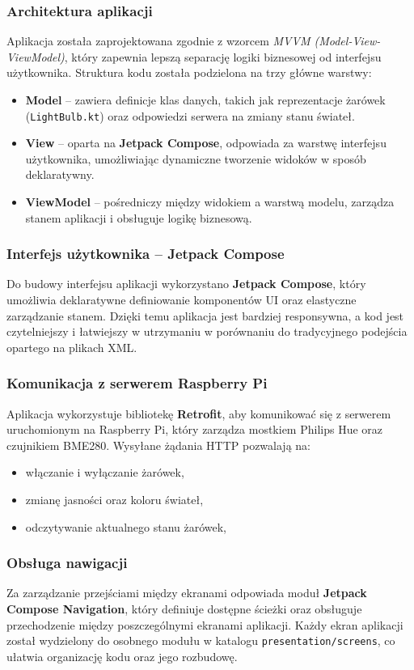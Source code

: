 \documentclass[12pt]{article}
\begin{document}
\subsubsection*{Architektura aplikacji}
Aplikacja została zaprojektowana zgodnie z wzorcem \textit{MVVM (Model-View-ViewModel)}, który zapewnia lepszą separację logiki biznesowej od interfejsu użytkownika. Struktura kodu została podzielona na trzy główne warstwy:
\begin{itemize}
    \item \textbf{Model} – zawiera definicje klas danych, takich jak reprezentacje żarówek (\texttt{LightBulb.kt}) oraz odpowiedzi serwera na zmiany stanu świateł.
    \item \textbf{View} – oparta na \textbf{Jetpack Compose}, odpowiada za warstwę interfejsu użytkownika, umożliwiając dynamiczne tworzenie widoków w sposób deklaratywny.
    \item \textbf{ViewModel} – pośredniczy między widokiem a warstwą modelu, zarządza stanem aplikacji i obsługuje logikę biznesową.
\end{itemize}

\subsubsection*{Interfejs użytkownika – Jetpack Compose}
Do budowy interfejsu aplikacji wykorzystano \textbf{Jetpack Compose}, który umożliwia deklaratywne definiowanie komponentów UI oraz elastyczne zarządzanie stanem. Dzięki temu
aplikacja jest bardziej responsywna, a kod jest czytelniejszy i łatwiejszy w utrzymaniu w porównaniu do tradycyjnego podejścia opartego na plikach XML.

\subsubsection*{Komunikacja z serwerem Raspberry Pi}
Aplikacja wykorzystuje bibliotekę \textbf{Retrofit}, aby komunikować się z serwerem uruchomionym na Raspberry Pi, który zarządza mostkiem Philips Hue oraz czujnikiem BME280. Wysyłane żądania HTTP pozwalają na:
\begin{itemize}
    \item włączanie i wyłączanie żarówek,
    \item zmianę jasności oraz koloru świateł,
    \item odczytywanie aktualnego stanu żarówek,
\end{itemize}

\subsubsection*{Obsługa nawigacji}
Za zarządzanie przejściami między ekranami odpowiada moduł \textbf{Jetpack Compose Navigation}, który definiuje dostępne ścieżki oraz obsługuje przechodzenie między poszczególnymi ekranami
aplikacji. Każdy ekran aplikacji został wydzielony do osobnego modułu w katalogu \texttt{presentation/screens}, co ułatwia organizację kodu oraz jego rozbudowę.
\end{document}
